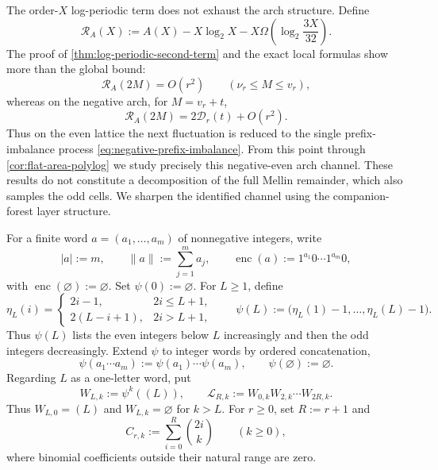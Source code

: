 \documentclass[11pt]{article}
\theoremstyle{definition}
\theoremstyle{remark}
\begin{document}
The order-$X$ log-periodic term does not exhaust the arch structure.  Define
\begin{equation}
\mathcal R_A(X)
:=A(X)-X\log_2X
-X\Omega\!\left(\log_2\frac{3X}{32}\right).
\label{eq:RA-def}
\end{equation}
The proof of \cref{thm:log-periodic-second-term} and the exact local formulas
show more than the global bound:
\begin{equation}
\mathcal R_A(2M)=O(r^2)
\qquad(\nu_r\le M\le v_r),
\label{eq:RA-positive-small}
\end{equation}
whereas on the negative arch, for $M=v_r+t$,
\begin{equation}
{
\mathcal R_A(2M)=2\mathscr D_r(t)+O(r^2).
}
\label{eq:RA-negative-D}
\end{equation}
Thus on the even lattice the next fluctuation is reduced to the single
prefix-imbalance process \eqref{eq:negative-prefix-imbalance}.  From this
point through \cref{cor:flat-area-polylog} we study precisely this
negative-even arch channel.  These results do not constitute a
decomposition of the full Mellin remainder, which also samples the odd
cells.  We sharpen the identified channel using the companion-forest layer
structure.

For a finite word \(a=(a_1,\ldots,a_m)\) of nonnegative integers, write
\begin{equation}
 |a|:=m,\qquad
 \|a\|:=\sum_{j=1}^m a_j,\qquad
 \operatorname{enc}(a):=1^{a_1}0\cdots1^{a_m}0,
 \label{eq:degree-word-encoding}
\end{equation}
with \(\operatorname{enc}(\varnothing):=\varnothing\).  Set
\(\psi(0):=\varnothing\).  For \(L\ge1\), define
\begin{equation}
 \eta_L(i)=
 \begin{cases}
  2i-1,&2i\le L+1,\\
  2(L-i+1),&2i>L+1,
 \end{cases}
 \qquad
 \psi(L):=
 \bigl(\eta_L(1)-1,\ldots,\eta_L(L)-1\bigr).
 \label{eq:companion-permutation-explicit}
\end{equation}
Thus \(\psi(L)\) lists the even integers below \(L\) increasingly and then
the odd integers decreasingly.  Extend \(\psi\) to integer words by ordered
concatenation,
\[
 \psi(a_1\cdots a_m):=\psi(a_1)\cdots\psi(a_m),
 \qquad \psi(\varnothing):=\varnothing.
\]
Regarding \(L\) as a one-letter word, put
\begin{equation}
 W_{L,k}:=\psi^k((L)),
 \qquad
 \mathcal L_{R,k}:=W_{0,k}W_{2,k}\cdots W_{2R,k}.
 \label{eq:companion-depth-words}
\end{equation}
Thus \(W_{L,0}=(L)\) and \(W_{L,k}=\varnothing\) for \(k>L\).  For
\(r\ge0\), set \(R:=r+1\) and
\begin{equation}
 C_{r,k}:=\sum_{i=0}^{R}\binom{2i}{k}
 \qquad(k\ge0),
 \label{eq:negative-layer-widths}
\end{equation}
where binomial coefficients outside their natural range are zero.
\end{document}

